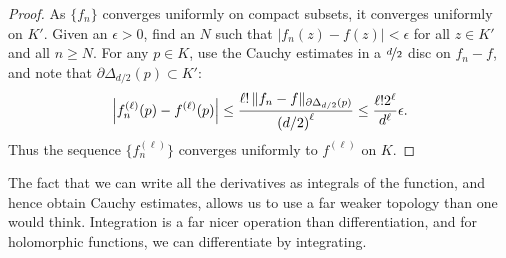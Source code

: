 \documentclass[12pt,openany]{book}
\newcommand{\avoidbreak}{\postdisplaypenalty=100}
\newcommand{\sabs}[1]{\lvert {#1} \rvert}
\newcommand{\snorm}[1]{\lVert {#1} \rVert}
\newcommand{\abs}[1]{\left\lvert {#1} \right\rvert}
\theoremstyle{plain}
\theoremstyle{remark}
\theoremstyle{definition}
\theoremstyle{exercise}
\theoremstyle{example}
\begin{document}
\begin{proof}
As $\{ f_n \}$ converges uniformly on compact subsets, it converges uniformly
on $K'$.  Given an $\epsilon > 0$, find an $N$ such that 
$\sabs{f_n(z)-f(z)} < \epsilon$ for all $z \in K'$ and
all $n \geq N$.
For any $p \in K$, use the Cauchy estimates in a $\nicefrac{d}{2}$ disc
on $f_n-f$, and note that
$\partial \Delta_{d/2}(p) \subset K'$:
\begin{equation*}
\abs{
f_n^{(\ell)}(p)
-
f^{(\ell)}(p)
}
\leq
\frac{\ell! \, \snorm{f_n-f}_{\partial \Delta_{d/2}(p)}}{{(d/2)}^{\ell}}
\leq
\frac{\ell!2^\ell}{d^\ell}\epsilon .
\avoidbreak
\end{equation*}
Thus the sequence $\bigl\{ f_n^{(\ell)} \bigr\}$ converges uniformly to $f^{(\ell)}$ on $K$.
\end{proof}

The fact that we can write all the derivatives as
integrals of the function, and hence obtain Cauchy estimates,
allows us to use a far weaker topology than one would think.
Integration is a far nicer operation than differentiation, and for
holomorphic functions, we can differentiate by integrating.
\end{document}
